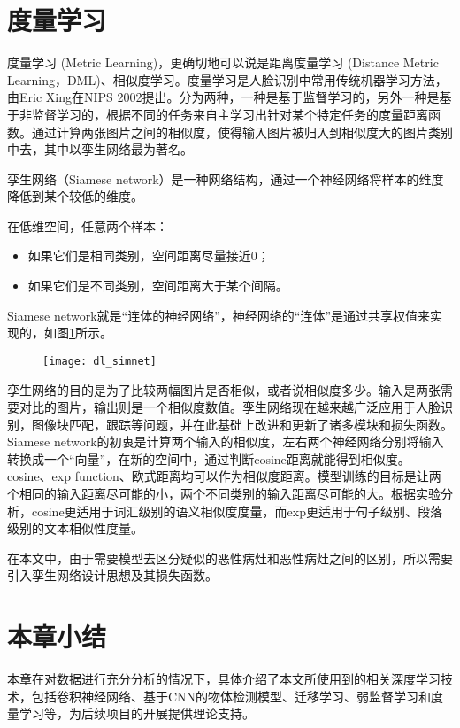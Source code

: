 \begin{comment}
多示例学习的初始目标是为未见过的包预测标签；然而，已有研究尝试识别那些之所以让正包变正的关键示例（key instance）。这在诸如没有细粒度标记训练数据的感兴趣区域定位的任务中特别有用。值得注意的是，标准的多示例学习 \cite{59dietterich1997solving}假定每一个正包必须包含一个关键示例，而还有其它研究假定不存在关键示例，每一个示例都对包标签有贡献\cite{60xu2004logistic, 61chen2006miles}；甚至假定存在多个概念，而仅当一个包包含满足所有概念的示例时，该包才是正的。

本文由于考虑的数据存在多层面的问题，除了在基于图片标准可以按照传统的标准来制定之外，考虑单个乳房，单个病例情况都需要引入多示例学习对结果进行评判。
\end{comment}

\section{度量学习}
度量学习 (Metric Learning)\cite{65bellet2013survey}，更确切地可以说是距离度量学习 (Distance Metric Learning，DML)、相似度学习。度量学习是人脸识别中常用传统机器学习方法，由Eric Xing在NIPS 2002提出。分为两种，一种是基于监督学习的，另外一种是基于非监督学习的，根据不同的任务来自主学习出针对某个特定任务的度量距离函数。通过计算两张图片之间的相似度，使得输入图片被归入到相似度大的图片类别中去，其中以孪生网络最为著名。

孪生网络（Siamese network）\cite{42chopra2005learning}是一种网络结构，通过一个神经网络将样本的维度降低到某个较低的维度。

在低维空间，任意两个样本：
\begin{itemize}
	\item 如果它们是相同类别，空间距离尽量接近0；
	\item 如果它们是不同类别，空间距离大于某个间隔。
	
\end{itemize}

Siamese network就是“连体的神经网络”，神经网络的“连体”是通过共享权值来实现的，如图\ref{fig:dl_simnet}所示。

	\begin{figure}[!htbp]
    \centering
    \texttt{[image: dl\_simnet]}
    \label{fig:dl_simnet}
	\end{figure}

孪生网络的目的是为了比较两幅图片是否相似，或者说相似度多少。输入是两张需要对比的图片，输出则是一个相似度数值。孪生网络现在越来越广泛应用于人脸识别，图像块匹配，跟踪等问题，并在此基础上改进和更新了诸多模块和损失函数。Siamese network的初衷是计算两个输入的相似度，左右两个神经网络分别将输入转换成一个“向量”，在新的空间中，通过判断cosine距离就能得到相似度。cosine、exp function、欧式距离均可以作为相似度距离。模型训练的目标是让两个相同的输入距离尽可能的小，两个不同类别的输入距离尽可能的大。根据实验分析，cosine更适用于词汇级别的语义相似度度量，而exp更适用于句子级别、段落级别的文本相似性度量。

在本文中，由于需要模型去区分疑似的恶性病灶和恶性病灶之间的区别，所以需要引入孪生网络设计思想及其损失函数。

\section{本章小结}
本章在对数据进行充分分析的情况下，具体介绍了本文所使用到的相关深度学习技术，包括卷积神经网络、基于CNN的物体检测模型、迁移学习、弱监督学习和度量学习等，为后续项目的开展提供理论支持。
